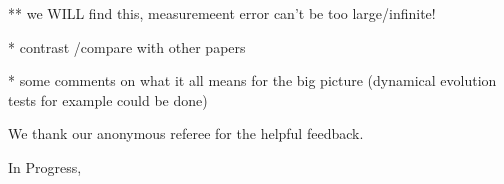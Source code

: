 \documentclass[twocolumn,prd,nofootinbib]{revtex4}
\begin{document}
** we WILL find this, measuremeent error can't be too large/infinite!

* contrast /compare with other papers 

* some comments on what it all means for the big picture (dynamical evolution tests for example could be done)














\begin{acknowledgements}
We thank our anonymous referee for the helpful feedback.

\end{acknowledgements}


\appendix
In Progress,





\end{document}
